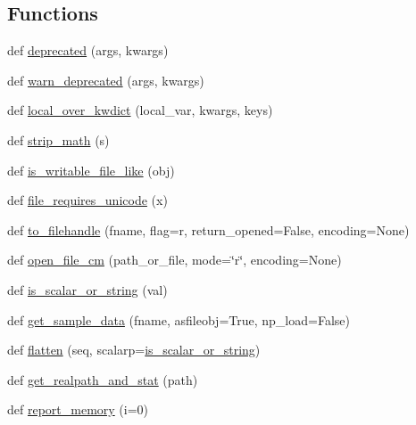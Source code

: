 \subsection*{Functions}
\begin{DoxyCompactItemize}
\item 
def \hyperlink{namespacematplotlib_1_1cbook_a5979ec40652233aee2a34f04e209e935}{deprecated} (args, kwargs)
\item 
def \hyperlink{namespacematplotlib_1_1cbook_a449199f6d127056fbb6ea42ebd0ca98c}{warn\+\_\+deprecated} (args, kwargs)
\item 
def \hyperlink{namespacematplotlib_1_1cbook_a293736790dc272651ffe29d54d8c877e}{local\+\_\+over\+\_\+kwdict} (local\+\_\+var, kwargs, keys)
\item 
def \hyperlink{namespacematplotlib_1_1cbook_aabc39eda5a8d0e60cdccc70fcf31011f}{strip\+\_\+math} (s)
\item 
def \hyperlink{namespacematplotlib_1_1cbook_a3f29aa0083b035701005f2ab74cd563d}{is\+\_\+writable\+\_\+file\+\_\+like} (obj)
\item 
def \hyperlink{namespacematplotlib_1_1cbook_a8e8aef949d3d004b55e40b5cec88fa0a}{file\+\_\+requires\+\_\+unicode} (x)
\item 
def \hyperlink{namespacematplotlib_1_1cbook_a1aee71b48934e4a383f1decb05b8e6d7}{to\+\_\+filehandle} (fname, flag=\textquotesingle{}r\textquotesingle{}, return\+\_\+opened=False, encoding=None)
\item 
def \hyperlink{namespacematplotlib_1_1cbook_a0d81ce7993d622e377e9d8412d626efd}{open\+\_\+file\+\_\+cm} (path\+\_\+or\+\_\+file, mode=\char`\"{}r\char`\"{}, encoding=None)
\item 
def \hyperlink{namespacematplotlib_1_1cbook_aa8e64eb7c542afa5d04be09e16c73607}{is\+\_\+scalar\+\_\+or\+\_\+string} (val)
\item 
def \hyperlink{namespacematplotlib_1_1cbook_a846b3b7e13d95cc8f596a8bbe7b62029}{get\+\_\+sample\+\_\+data} (fname, asfileobj=True, np\+\_\+load=False)
\item 
def \hyperlink{namespacematplotlib_1_1cbook_a30259be2209ddb2e1657d99d4bb80096}{flatten} (seq, scalarp=\hyperlink{namespacematplotlib_1_1cbook_aa8e64eb7c542afa5d04be09e16c73607}{is\+\_\+scalar\+\_\+or\+\_\+string})
\item 
def \hyperlink{namespacematplotlib_1_1cbook_ad9abd637312c02b7c26d7d5037fddc5d}{get\+\_\+realpath\+\_\+and\+\_\+stat} (path)
\item 
def \hyperlink{namespacematplotlib_1_1cbook_a535511c13efe4c9961e0c49ad906fe8b}{report\+\_\+memory} (i=0)

\end{DoxyCompactItemize}
